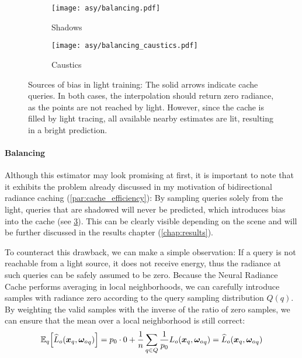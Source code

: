 \begin{figure}[htb!]
    \centering
    \begin{subfigure}{0.5\textwidth}
        \centering
        \texttt{[image: asy/balancing.pdf]}
        \caption{Shadows}
        \label{fig:balancing_shadows}
    \end{subfigure}%
    \begin{subfigure}{0.5\textwidth}
        \centering
        \texttt{[image: asy/balancing\_caustics.pdf]}
        \caption{Caustics}
        \label{fig:balancing_caustics}
    \end{subfigure}
    \caption{Sources of bias in light training: The solid arrows indicate cache queries. In both cases, the interpolation should return zero radiance, as the points are not reached by light. However, since the cache is filled by light tracing, all available nearby estimates are lit, resulting in a bright prediction.}
    \label{fig:balancing}
\end{figure}

\paragraph{Balancing} Although this estimator may look promising at first, it is important to note that it exhibits the problem already discussed in my motivation of bidirectional radiance caching (\cref{par:cache_efficiency}):
By sampling queries solely from the light, queries that are shadowed will never be predicted, which introduces bias into the cache (see \cref{fig:balancing}).
This can be clearly visible depending on the scene and will be further discussed in the results chapter (\cref{chap:results}).

To counteract this drawback, we can make a simple observation:
If a query is not reachable from a light source, it does not receive energy, thus the radiance at such queries can be safely assumed to be zero.
Because the Neural Radiance Cache performs averaging in local neighborhoods, we can carefully introduce samples with radiance zero according to the query sampling distribution $Q(q)$.
By weighting the valid samples with the inverse of the ratio of zero samples, we can ensure that the mean over a local neighborhood is still correct:
\begin{equation}
\expectationvar{q}{{\widehat{L}_o}(\vec{x}_q, \wo_q)} = p_0 \cdot 0 + \frac{1}{n} \sum_{q \in Q} \frac{1}{p_0} L_o(\vec{x}_q, \wo_q) = \widehat{L}_o(\vec{x}_q, \wo_q)
\end{equation}

